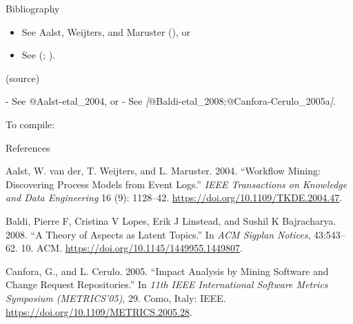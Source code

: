 \documentclass[
  10pt,
  ignorenonframetext,
  serif,onlymath]{beamer}
\newenvironment{Shaded}{}{}
\newcommand{\AttributeTok}[1]{\textcolor[rgb]{0.49,0.56,0.16}{#1}}
\newcommand{\CommentTok}[1]{\textcolor[rgb]{0.38,0.63,0.69}{\textit{#1}}}
\newcommand{\DataTypeTok}[1]{\textcolor[rgb]{0.56,0.13,0.00}{#1}}
\newcommand{\ExtensionTok}[1]{#1}
\newcommand{\NormalTok}[1]{#1}
\newcommand{\OtherTok}[1]{\textcolor[rgb]{0.00,0.44,0.13}{#1}}
\newcommand{\SpecialStringTok}[1]{\textcolor[rgb]{0.73,0.40,0.53}{#1}}
\providecommand{\tightlist}{%
  \setlength{\itemsep}{0pt}\setlength{\parskip}{0pt}}
\newlength{\cslhangindent}
\newenvironment{CSLReferences}[2] %
 {\begin{list}{}{%
  \setlength{\itemindent}{0pt}
  \setlength{\leftmargin}{0pt}
  \setlength{\parsep}{0pt}
  \ifodd #1
   \setlength{\leftmargin}{\cslhangindent}
   \setlength{\itemindent}{-1\cslhangindent}
  \fi
  \setlength{\itemsep}{#2\baselineskip}}}
 {\end{list}}
\begin{document}
\begin{frame}[fragile]{Bibliography}
\label{bibliography}
\begin{itemize}
\tightlist
\item
  See Aalst, Weijters, and Maruster
  (), or
\item
  See (;
  ).
\end{itemize}

(source)

\begin{Shaded}
\begin{Highlighting}[]
\SpecialStringTok{{-} }\NormalTok{See @Aalst{-}etal\_2004, or}
\SpecialStringTok{{-} }\NormalTok{See }\CommentTok{[}\OtherTok{@Baldi{-}etal\_2008;@Canfora{-}Cerulo\_2005a}\CommentTok{]}\NormalTok{.}
\end{Highlighting}
\end{Shaded}

To compile:

\begin{Shaded}
\end{Shaded}
\end{frame}

\begin{frame}[allowframebreaks]{References}
\label{references}
\label{refs}
\begin{CSLReferences}{1}{0}
Aalst, W. van der, T. Weijters, and L. Maruster. 2004. {``Workflow
Mining: Discovering Process Models from Event Logs.''} \emph{IEEE
Transactions on Knowledge and Data Engineering} 16 (9): 1128--42.
\url{https://doi.org/10.1109/TKDE.2004.47}.

Baldi, Pierre F, Cristina V Lopes, Erik J Linstead, and Sushil K
Bajracharya. 2008. {``A Theory of Aspects as Latent Topics.''} In
\emph{ACM Sigplan Notices}, 43:543--62. 10. ACM.
\url{https://doi.org/10.1145/1449955.1449807}.

Canfora, G., and L. Cerulo. 2005. {``Impact Analysis by Mining Software
and Change Request Repositories.''} In \emph{11th IEEE International
Software Metrics Symposium (METRICS'05)}, 29. Como, Italy: IEEE.
\url{https://doi.org/10.1109/METRICS.2005.28}.

\end{CSLReferences}
\end{frame}
\end{document}
